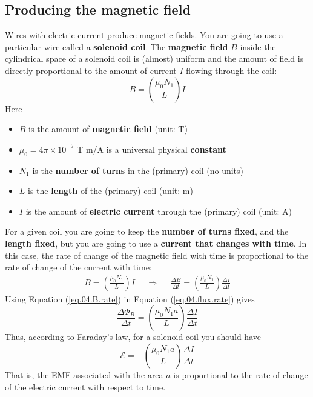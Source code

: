 \subsection{Producing the magnetic field}
%
Wires with electric current produce magnetic fields. You are going to use a particular wire called a \textbf{solenoid coil}. The \textbf{magnetic field} $B$ inside the cylindrical space of a solenoid coil is (almost) uniform and the amount of field is directly proportional to the amount of current $I$ flowing through the coil:
\begin{equation}
	B = \left(\frac{\mu_{0} N_{1}}{L}\right) I
	\label{eq.04.B.coil}
\end{equation}
Here
\begin{itemize}
	\item $B$ is the amount of \textbf{magnetic field} (unit: T)
	\item $\mu_{0} = 4 \pi \times 10^{-7}$ T {\textperiodcentered} m/A  is a universal physical \textbf{constant}
	\item $N_{1}$ is the \textbf{number of turns} in the (primary) coil (no units)
	\item $L$ is the \textbf{length} of the (primary) coil (unit: m)
	\item $I$ is the amount of \textbf{electric current} through the (primary) coil (unit: A)
\end{itemize}
For a given coil you are going to keep the \textbf{number of turns fixed}, and the \textbf{length fixed}, but you are going to use a \textbf{current that changes with time}. In this case, the rate of change of the magnetic field with time is proportional to the rate of change of the current with time:
\begin{align}
	B = \left(\frac{\mu_{0} N_{1}}{L}\right) I && \Longrightarrow && \frac{\Delta B}{\Delta t} = \left( \frac{\mu_{0} N_{1}}{L} \right) \frac{\Delta I}{\Delta t}
	\label{eq.04.B.rate}
\end{align}
Using Equation (\ref{eq.04.B.rate}) in Equation (\ref{eq.04.flux.rate}) gives
\begin{equation}
	\frac{\Delta \Phi_{B}}{\Delta t} = \left( \frac{\mu_{0} N_{1} a}{L} \right) \frac{\Delta I}{\Delta t}
\end{equation}
Thus, according to Faraday's law, for a solenoid coil you should have
\begin{equation}
	\mathcal{E} = -\left( \frac{\mu_{0} N_{1} a}{L} \right) \frac{\Delta I}{\Delta t}
	\label{eq.04.emf.solenoid}
\end{equation}
That is, the EMF associated with the area $a$ is proportional to the rate of change of the electric current with respect to time.
%
